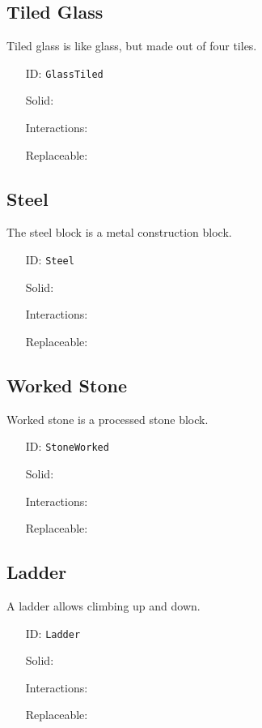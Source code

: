 \subsection{Tiled Glass}\label{subsec:blocks_tiled glass}
Tiled glass is like glass, but made out of four tiles.
\newline
\begin{itemize}[nosep]
    \item[ID:] \texttt{GlassTiled}
    \item[Solid:]  \Checkmark \item[Interactions:]  \XSolidBrush \item[Replaceable:]  \XSolidBrush
\end{itemize}

\subsection{Steel}\label{subsec:blocks_steel}
The steel block is a metal construction block.
\newline
\begin{itemize}[nosep]
    \item[ID:] \texttt{Steel}
    \item[Solid:]  \Checkmark \item[Interactions:]  \XSolidBrush \item[Replaceable:]  \XSolidBrush
\end{itemize}

\subsection{Worked Stone}\label{subsec:blocks_worked stone}
Worked stone is a processed stone block.
\newline
\begin{itemize}[nosep]
    \item[ID:] \texttt{StoneWorked}
    \item[Solid:]  \Checkmark \item[Interactions:]  \XSolidBrush \item[Replaceable:]  \XSolidBrush
\end{itemize}

\subsection{Ladder}\label{subsec:blocks_ladder}
A ladder allows climbing up and down.
\newline
\begin{itemize}[nosep]
    \item[ID:] \texttt{Ladder}
    \item[Solid:]  \XSolidBrush \item[Interactions:]  \XSolidBrush \item[Replaceable:]  \XSolidBrush
\end{itemize}

